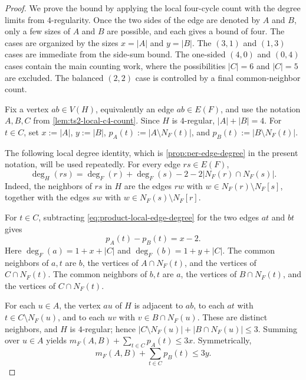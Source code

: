 \documentclass[10pt,a4paper]{amsart}
\begin{document}
\begin{proof}
We prove the bound by applying the local four-cycle count with the degree limits from $4$-regularity.
Once the two sides of the edge are denoted by $A$ and $B$, only a few sizes of $A$ and $B$ are possible, and each gives a bound of four.
The cases are organized by the sizes $x=|A|$ and $y=|B|$.
The $(3,1)$ and $(1,3)$ cases are immediate from the side-sum bound.
The one-sided $(4,0)$ and $(0,4)$ cases contain the main counting work, where the possibilities $|C|=6$ and $|C|=5$ are excluded.
The balanced $(2,2)$ case is controlled by a final common-neighbor count.

Fix a vertex $ab\in V(H)$, equivalently an edge $ab\in E(F)$, and use the notation $A,B,C$ from \cref{lem:ts2-local-c4-count}.
Since $H$ is $4$-regular, $|A|+|B|=4$.
For $t\in C$, set $x:=|A|$, $y:=|B|$, $p_A(t):=|A\setminus N_F(t)|$, and $p_B(t):=|B\setminus N_F(t)|$.

The following local degree identity, which is \cref{prop:per-edge-degree} in the present notation, will be used repeatedly.
For every edge $rs\in E(F)$,
\begin{equation}
\label{eq:product-local-edge-degree}
\deg_H(rs)=\deg_F(r)+\deg_F(s)-2-2|N_F(r)\cap N_F(s)|.
\end{equation}
Indeed, the neighbors of $rs$ in $H$ are the edges $rw$ with $w\in N_F(r)\setminus N_F[s]$, together with the edges $sw$ with $w\in N_F(s)\setminus N_F[r]$.

For $t\in C$, subtracting \eqref{eq:product-local-edge-degree} for the two edges $at$ and $bt$ gives
\begin{equation}
\label{eq:product-pa-pb}
p_A(t)-p_B(t)=x-2.
\end{equation}
Here $\deg_F(a)=1+x+|C|$ and $\deg_F(b)=1+y+|C|$.
The common neighbors of $a,t$ are $b$, the vertices of $A\cap N_F(t)$, and the vertices of $C\cap N_F(t)$.
The common neighbors of $b,t$ are $a$, the vertices of $B\cap N_F(t)$, and the vertices of $C\cap N_F(t)$.

For each $u\in A$, the vertex $au$ of $H$ is adjacent to $ab$, to each $at$ with $t\in C\setminus N_F(u)$, and to each $uv$ with $v\in B\cap N_F(u)$.
These are distinct neighbors, and $H$ is $4$-regular; hence $|C\setminus N_F(u)|+|B\cap N_F(u)|\le 3$.
Summing over $u\in A$ yields $\displaystyle m_F(A,B)+\sum_{t\in C}p_A(t)\le 3x$.
Symmetrically,
\begin{equation}
\label{eq:product-b-side-sum}
m_F(A,B)+\sum_{t\in C}p_B(t)\le 3y.
\end{equation}


\end{proof}
\end{document}
